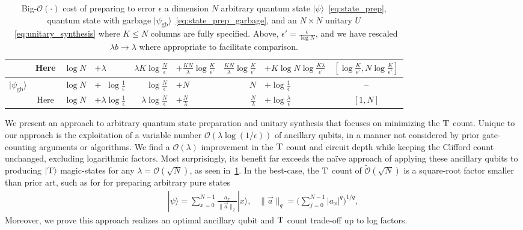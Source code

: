 \documentclass[a4paper,onecolumn,10pt,accepted=2024-05-22]{quantumarticle}
\newcommand{\ket}[1]{| #1\rangle}        %
\begin{document}
{\begin{table}
{\begin{tabular}{cc|rl|rl|rl|c}
        &Here & $\log{N}$&$+\lambda$
        &$\lambda K\log{\frac{N}{\epsilon}}$&$+\frac{KN}{\lambda}\log{\frac{K}{\epsilon'}}$
        & $\frac{KN}{\lambda}\log{\frac{K}{\epsilon'}}$&$+K\log{N}\log{\frac{K\lambda}{\epsilon'}}$& $[\log{\frac{K}{\epsilon'}},N\log{\frac{K}{\epsilon'}}]$
        \\
        \hline
        \multirow{2}{*}{$\ket{\psi_\textrm{gb}}$}&\cite{Babbush2018encoding}&$\log{N}$&$+\;\;\log{\frac{1}{\epsilon}}$&$\log{\frac{N}{\epsilon}}$&$+N$&$N$&$+\log{\frac{1}{\epsilon}}$&--
        \\
        &Here& $\log{N}$&$+\lambda\log{\frac{1}{\epsilon}}$  &$\lambda\log{\frac{N}{\epsilon}}$&$+\frac{N}{\lambda}$& $\frac{N}{\lambda}$&$+\log{\frac{\lambda}{\epsilon}}$&$[1,N]$
    \end{tabular}}
    \caption{\label{tab:synthesis_cost_comparison} Big-$\mathcal{O}(\cdot)$ cost of preparing to error $\epsilon$ a dimension $N$ arbitrary quantum state $\ket{\psi}$~\cref{eq:state_prep}, quantum state  with garbage $\ket{\psi_\textrm{gb}}$~\cref{eq:state_prep_garbage}, and an $N\times N$ unitary $U$~\cref{eq:unitary_synthesis} where $K\le N$ columns are fully specified. Above, $\epsilon'=\frac{\epsilon}{\log{N}}$, and we have rescaled $\lambda b\rightarrow\lambda$ where appropriate to facilitate comparison.}
\end{table}
}
	
	We present an approach to arbitrary quantum state preparation and unitary synthesis that focuses on minimizing the $\textsc{T}$ count. Unique to our approach is the exploitation of a variable number $\mathcal{O}(\lambda\log{(1/\epsilon)})$ of ancillary qubits, in a manner not considered by prior gate-counting arguments or algorithms. We find a $\mathcal{O}(\lambda)$ improvement in the $\textsc{T}$ count and circuit depth while keeping the Clifford count unchanged, excluding logarithmic factors. Most surprisingly, its benefit far exceeds the na\"{i}ve approach of applying these ancillary qubits to producing $\ket{\textsc{T}}$ magic-states for any $\lambda=\mathcal{O}(\sqrt{N})$, as seen in~\cref{tab:synthesis_cost_comparison}. In the best-case, the $\textsc{T}$ count of $\tilde{\mathcal{O}}(\sqrt{N})$ is a square-root factor smaller than prior art, such as for for preparing arbitrary pure states
	\begin{align}
	\label{eq:state_prep}
	\ket{\psi}=\sum_{x=0}^{N-1} \frac{a_x}{\|\vec{a}\|_2} \ket{x},\;\;\;
	\|\vec{a}\|_q=\Big(\sum_{j=0}^{N-1}|a_x|^q\Big)^{1/q},
	\end{align}
	Moreover, we prove this approach realizes an optimal ancillary qubit and $\textsc{T}$ count trade-off up to log factors.
	
\end{document}
